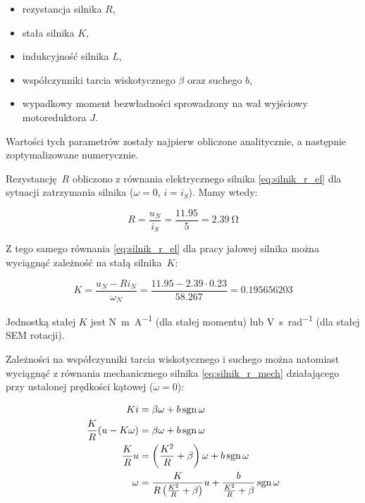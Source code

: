 \begin{itemize}
    \item rezystancja silnika $R$,
    \item stała silnika $K$,
    \item indukcyjność silnika $L$,
    \item współczynniki tarcia wiskotycznego $\beta$ oraz suchego $b$,
    \item wypadkowy moment bezwładności sprowadzony na wał wyjściowy motoreduktora $J$.
\end{itemize}

Wartości tych parametrów zostały najpierw obliczone analitycznie, a następnie zoptymalizowane numerycznie.

Rezystancję $R$ obliczono z równania elektrycznego silnika \eqref{eq:silnik_r_el} dla sytuacji zatrzymania silnika ($\omega = 0$, $i = i_S$). Mamy wtedy:

\begin{equation}
    R = \frac{u_N}{i_S} = \frac{\num{11,95}}{\num{5}} = \SI{2,39}{\ohm}
\end{equation}

Z tego samego równania \eqref{eq:silnik_r_el} dla pracy jałowej silnika można wyciągnąć zależność na stałą silnika~$K$:

\begin{equation}
    K = \frac{u_N - R i_N}{\omega_N} = \frac{\num{11,95} - \num{2,39} \cdot \num{0,23}}{\num{58,267}} = \num{0,195656203}
\end{equation}

Jednostką stałej $K$ jest \si[per-mode=fraction]{\newton\meter\per\ampere} (dla stałej momentu) lub \si[per-mode=fraction]{\volt\second\per\radian} (dla stałej SEM rotacji).

Zależności na współczynniki tarcia wiskotycznego i suchego można natomiast wyciągnąć z równania mechanicznego silnika \eqref{eq:silnik_r_mech} działającego przy ustalonej prędkości kątowej ($\dot{\omega} = 0$):

\begin{align}
    K i &= \beta \omega + b \operatorname{sgn} \omega \nonumber \\
    \frac{K}{R} (u - K \omega) &= \beta \omega + b \operatorname{sgn} \omega \nonumber \\
    \frac{K}{R} u &= \left(\frac{K^2}{R} + \beta \right) \omega + b \operatorname{sgn} \omega \nonumber \\
    \omega &= \frac{K}{R \left(\frac{K^2}{R} + \beta \right)} u + \frac{b}{\frac{K^2}{R} + \beta} \operatorname{sgn} \omega \label{eq:predkosc_obrotowa_walu}
\end{align}

